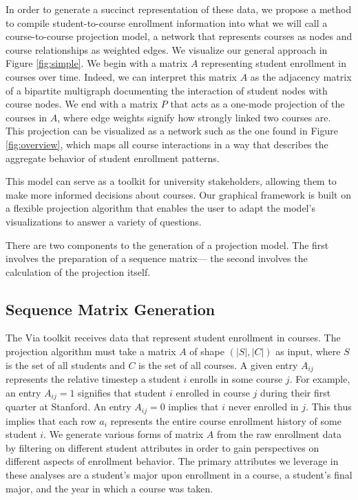 \documentclass{sigchi}
\begin{document}
In order to generate a succinct representation of these data, we propose a method to compile student-to-course enrollment information into what we will call a course-to-course projection model, a network that represents courses as nodes and course relationships as weighted edges. We visualize our general approach in Figure \ref{fig:simple}. We begin with a matrix $A$ representing student enrollment in courses over time. Indeed, we can interpret this matrix $A$ as the adjacency matrix of a bipartite multigraph documenting the interaction of student nodes with course nodes.  We end with a matrix $P$ that acts as a one-mode projection of the courses in $A$, where edge weights signify how strongly linked two courses are. This projection can be visualized as a network such as the one found in Figure \ref{fig:overview}, which maps all course interactions in a way that describes the aggregate behavior of student enrollment patterns.

This model can serve as a toolkit for university stakeholders, allowing them to make more informed decisions about courses. Our graphical framework is built on a flexible projection algorithm that enables the user to adapt the model's visualizations to answer a variety of questions. 

There are two components to the generation of a projection model. The first involves the preparation of a sequence matrix--- the second involves the calculation of the projection itself.

\subsection{Sequence Matrix Generation}
\label{sec:seq_martix}

The Via toolkit receives data that represent student enrollment in courses. The projection algorithm must take a matrix $A$ of shape $(|S|, |C|)$ as input, where $S$ is the set of all students and $C$ is the set of all courses. A given entry $A_{ij}$ represents the relative timestep a student $i$ enrolls in some course $j$. For example, an entry $A_{ij} = 1$ signifies that student $i$ enrolled in course $j$ during their first quarter at Stanford. An entry $A_{ij} = 0$ implies that $i$ never enrolled in $j$. This thus implies that each row $a_i$ represents the entire course enrollment history of some student $i$. We generate various forms of matrix $A$ from the raw enrollment data by filtering on different student attributes in order to gain perspectives on different aspects of enrollment behavior. The primary attributes we leverage in these analyses are a student's major upon enrollment in a course, a student's final major, and the year in which a course was taken. 
\end{document}
